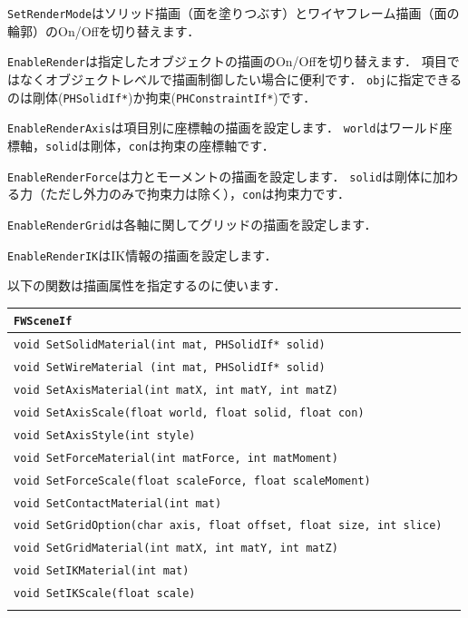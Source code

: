 \texttt{SetRenderMode}\KLUDGE はソリッド描画（面を塗りつぶす）とワイヤフレーム描画（面の輪郭）のOn/Off\KLUDGE を切り替えます．

\texttt{EnableRender}\KLUDGE は指定したオブジェクトの描画のOn/Off\KLUDGE を切り替えます．
\KLUDGE 項目ではなくオブジェクトレベルで描画制御したい場合に便利です．
\texttt{obj}\KLUDGE に指定できるのは剛体(\texttt{PHSolidIf*})\KLUDGE か拘束(\texttt{PHConstraintIf*})\KLUDGE です．

\texttt{EnableRenderAxis}\KLUDGE は項目別に座標軸の描画を設定します．
\texttt{world}\KLUDGE はワールド座標軸，\texttt{solid}\KLUDGE は剛体，\texttt{con}\KLUDGE は拘束の座標軸です．

\texttt{EnableRenderForce}\KLUDGE は力とモーメントの描画を設定します．
\texttt{solid}\KLUDGE は剛体に加わる力（ただし外力のみで拘束力は除く），\texttt{con}\KLUDGE は拘束力です．

\texttt{EnableRenderGrid}\KLUDGE は各軸に関してグリッドの描画を設定します．

\texttt{EnableRenderIK}\KLUDGE はIK\KLUDGE 情報の描画を設定します．

\KLUDGE 以下の関数は描画属性を指定するのに使います．

\noindent
\begin{tabular}{p{.8\hsize}p{.1\hsize}}
\\
\texttt{FWSceneIf}																\\ \midrule
\texttt{void SetSolidMaterial(int mat, PHSolidIf* solid)}						&	\\
\texttt{void SetWireMaterial (int mat, PHSolidIf* solid)}						&	\\
\texttt{void SetAxisMaterial(int matX, int matY, int matZ)}						&	\\
\texttt{void SetAxisScale(float world, float solid, float con)}					&	\\
\texttt{void SetAxisStyle(int style)}											&	\\
\texttt{void SetForceMaterial(int matForce, int matMoment)}						&	\\
\texttt{void SetForceScale(float scaleForce, float scaleMoment)}				&	\\
\texttt{void SetContactMaterial(int mat)}										&	\\
\texttt{void SetGridOption(char axis, float offset, float size, int slice)}		&	\\
\texttt{void SetGridMaterial(int matX, int matY, int matZ)}						&	\\
\texttt{void SetIKMaterial(int mat)}											&	\\
\texttt{void SetIKScale(float scale)}											&	\\
\\
\end{tabular}

